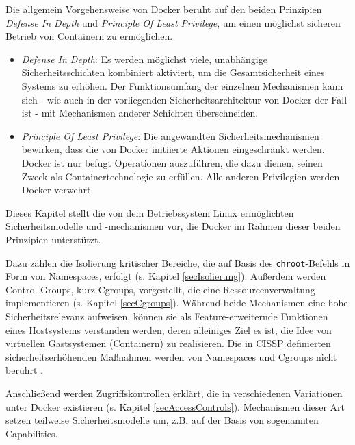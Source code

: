 \documentclass[../main.tex]{subfiles}
\begin{document}
	Die allgemein Vorgehensweise von Docker beruht auf den beiden Prinzipien \emph{Defense In Depth} und \emph{Principle Of Least Privilege}, um einen möglichst sicheren Betrieb von Containern zu ermöglichen.

	\begin{itemize}
			\item \emph{Defense In Depth}: Es werden möglichst viele, unabhängige Sicherheitsschichten kombiniert aktiviert, um die Gesamtsicherheit eines Systems zu erhöhen. Der Funktionsumfang der einzelnen Mechanismen kann sich - wie auch in der vorliegenden Sicherheitsarchitektur von Docker der Fall ist - mit Mechanismen anderer Schichten überschneiden.
			\item \emph{Principle Of Least Privilege}: Die angewandten Sicherheitsmechanismen bewirken, dass die von Docker initiierte Aktionen eingeschränkt werden. Docker ist nur befugt Operationen auszuführen, die dazu dienen, seinen Zweck als Containertechnologie zu erfüllen. Alle anderen Privilegien werden Docker verwehrt.
	\end{itemize}


	Dieses Kapitel stellt die von dem Betriebssystem Linux ermöglichten Sicherheitsmodelle und -mechanismen vor, die Docker im Rahmen dieser beiden Prinzipien unterstützt.

	Dazu zählen die Isolierung kritischer Bereiche, die auf Basis des \texttt{chroot}-Befehls in Form von Namespaces, erfolgt (s. Kapitel \ref{secIsolierung}). Außerdem werden Control Groups, kurz Cgroups, vorgestellt, die eine Ressourcenverwaltung implementieren (s. Kapitel \ref{secCgroups}). Während beide Mechanismen eine hohe Sicherheitsrelevanz aufweisen, können sie als Feature-erweiternde Funktionen eines Hostsystems verstanden werden, deren alleiniges Ziel es ist, die Idee von virtuellen Gastsystemen (Containern) zu realisieren. Die in CISSP definierten sicherheitserhöhenden Maßnahmen werden von Namespaces und Cgroups nicht berührt \cite{....}.

	Anschließend werden Zugriffskontrollen erklärt, die in verschiedenen Variationen unter Docker existieren (s. Kapitel \ref{secAccessControls}). Mechanismen dieser Art setzen teilweise Sicherheitsmodelle um, z.B. auf der Basis von sogenannten Capabilities.
\end{document}
